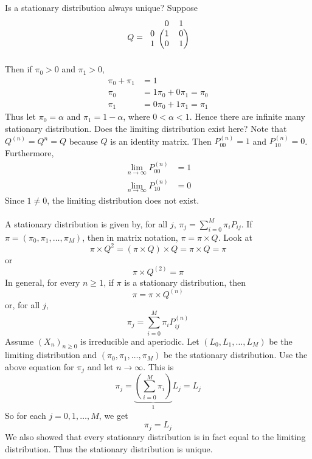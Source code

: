 \documentclass[12pt]{article}
\begin{document}
Is a stationary distribution always unique? Suppose $$ Q = \begin{blockarray}{ccc}
&0&1 \\
\begin{block}{c(cc)}
0 & 1 & 0  \\
1 & 0 & 1  \\   \end{block} \end{blockarray} $$ Then if $\pi_0 > 0$ and $\pi_1 > 0$, $$ \begin{aligned} \pi_0 + \pi_1 &= 1 \\ \pi_0 &= 1\pi_0 + 0\pi_1 = \pi_0 \\ \pi_1 &= 0\pi_0 + 1\pi_1 = \pi_1 \end{aligned} $$ Thus let $\pi_0 = \alpha$ and $\pi_1 = 1 - \alpha$, where $ 0 < \alpha < 1$. Hence there are infinite many stationary distribution. Does the limiting distribution exist here? Note that $Q^{(n)} = Q^n = Q$ because $Q$ is an identity matrix. Then $P_{00}^{(n)} = 1$ and $P_{10}^{(n)} = 0$. Furthermore, $$ \begin{aligned} \lim_{n\to\infty} P_{00}^{(n)} &= 1 \\ \lim_{n\to\infty} P_{10}^{(n)} &= 0 \end{aligned} $$ Since $1 \neq 0$, the limiting distribution does not exist. \\~\\
A stationary distribution is given by, for all $j$, $\pi_j = \sum_{i=0}^M \pi_iP_{ij}$. If $\pi = (\pi_0,\pi_1,\dots,\pi_M)$, then in matrix notation, $\pi = \pi \times Q$. Look at $$\pi \times Q^2 = (\pi \times Q) \times Q = \pi \times Q = \pi $$ or $$\pi \times Q^{(2)} = \pi $$ In general, for every $n\geq1$, if $\pi$ is a stationary distribution, then $$ \pi = \pi \times Q^{(n)} $$ or, for all $j$, $$ \pi_j = \sum_{i=0}^M \pi_iP_{ij}^{(n)} $$ 
Assume $(X_n)_{n\geq0}$ is irreducible and aperiodic. Let $(L_0,L_1,\dots,L_M)$ be the limiting distribution and $(\pi_0,\pi_1,\dots,\pi_M)$ be the stationary distribution. Use the above equation for $\pi_j$ and let $n\to\infty$. This is $$ \pi_j = \underbrace{(\sum_{i=0}^M \pi_i)}_{1}L_j = L_j $$ So for each $j=0,1,\dots,M$, we get $$ \pi_j = L_j$$ We also showed that every stationary distribution is in fact equal to the limiting distribution. Thus the stationary distribution is unique. 
\end{document}
